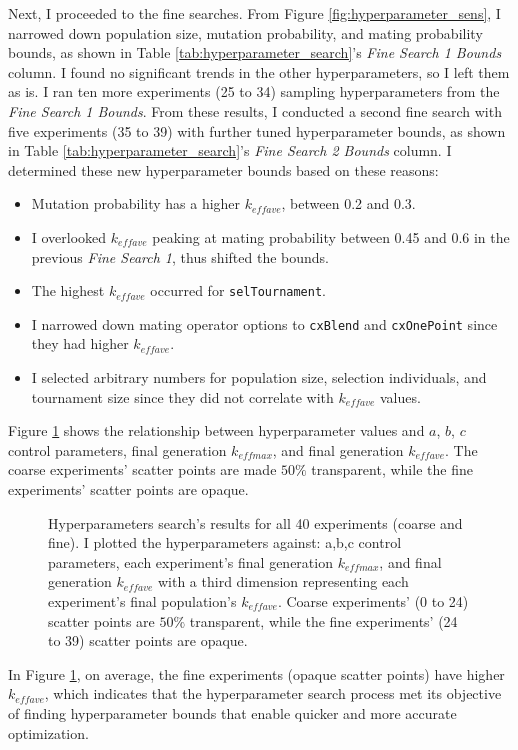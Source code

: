 Next, I proceeded to the fine searches. 
From Figure \ref{fig:hyperparameter_sens}, I narrowed down population size, 
mutation probability, and mating probability bounds, as shown in Table 
\ref{tab:hyperparameter_search}'s \textit{Fine Search 1 Bounds} column. 
I found no significant trends in the other hyperparameters, so I left them 
as is. 
I ran ten more experiments (25 to 34) sampling hyperparameters from 
the \textit{Fine Search 1 Bounds}. 
From these results, I conducted a second fine search with five experiments 
(35 to 39) with further tuned hyperparameter bounds, as shown in Table 
\ref{tab:hyperparameter_search}'s \textit{Fine Search 2 Bounds} column. 
I determined these new hyperparameter bounds based on these reasons: 
\begin{itemize}
    \item Mutation probability has a higher $k_{eff ave}$, between 0.2 and 0.3.
    \item I overlooked $k_{eff ave}$  peaking at mating probability between 
    0.45 and 0.6 in the previous \textit{Fine Search 1}, thus shifted the bounds. 
    \item The highest $k_{eff ave}$ occurred for \texttt{selTournament}. 
    \item I narrowed down mating operator options to \texttt{cxBlend} and 
    \texttt{cxOnePoint} since they had higher $k_{eff ave}$. 
    \item I selected arbitrary numbers for population size, 
    selection individuals, and tournament size since they did not 
    correlate with $k_{eff ave}$ values. 
\end{itemize}
Figure \ref{fig:input_hyperparameters_sens} shows the relationship between 
hyperparameter values and $a$, $b$, $c$ control parameters, final generation 
$k_{eff max}$, and final generation $k_{eff ave}$. 
The coarse experiments' scatter points are made $50\%$ transparent, while the fine 
experiments' scatter points are opaque. 
\begin{figure}[]
    \centering
    \caption{Hyperparameters search's results for all 40 experiments (coarse 
    and fine). I plotted the hyperparameters against: a,b,c control parameters, 
    each experiment's final generation $k_{eff max}$, and final generation 
    $k_{eff ave}$ with a third dimension representing each experiment's final 
    population's $k_{eff ave}$. Coarse experiments' (0 to 24) scatter points 
    are $50\%$ transparent, while the fine experiments' (24 to 39) scatter points 
    are opaque. }
    \label{fig:input_hyperparameters_sens}
\end{figure}
In Figure \ref{fig:input_hyperparameters_sens}, on average, the fine experiments 
(opaque scatter points) have higher $k_{eff ave}$, which indicates that the
hyperparameter search process met its objective of finding hyperparameter 
bounds that enable quicker and more accurate optimization. 


